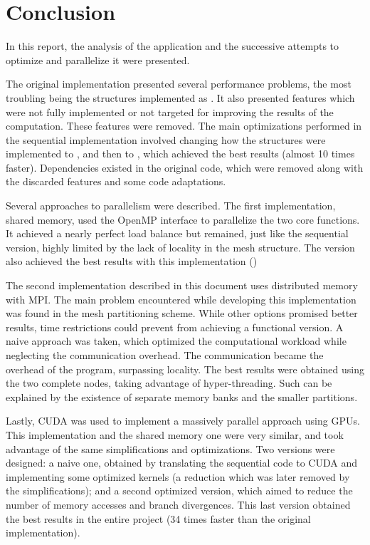 \section{Conclusion}
\label{sec:conclusion}

In this report, the analysis of the \polu application and the successive attempts to optimize and parallelize it were presented.

The original implementation presented several performance problems, the most troubling being the structures implemented as \aop. It also presented features which were not fully implemented or not targeted for improving the results of the computation. These features were removed. The main optimizations performed in the sequential implementation involved changing how the structures were implemented to \aos, and then to \soa, which achieved the best results (almost 10 times faster).
Dependencies existed in the original code, which were removed along with the discarded features and some code adaptations.

Several approaches to parallelism were described. The first implementation, shared memory, used the OpenMP interface to parallelize the two core functions. It achieved a nearly perfect load balance but remained, just like the sequential version, highly limited by the lack of locality in the mesh structure. The \soa version also achieved the best results with this implementation ()


The second implementation described in this document uses distributed memory with MPI. The main problem encountered while developing this implementation was found in the mesh partitioning scheme. While other options promised better results, time restrictions could prevent from achieving a functional version. A naive approach was taken, which optimized the computational workload while neglecting the communication overhead. The communication became the overhead of the program, surpassing locality. The best results were obtained using the two complete nodes, taking advantage of hyper-threading. Such can be explained by the existence of separate memory banks and the smaller partitions.

Lastly, CUDA was used to implement a massively parallel approach using GPUs. This implementation and the shared memory one were very similar, and took advantage of the same simplifications and optimizations. Two versions were designed: a naive one, obtained by translating the sequential code to CUDA and implementing some optimized kernels (a reduction which was later removed by the simplifications); and a second optimized version, which aimed to reduce the number of memory accesses and branch divergences. This last version obtained the best results in the entire project (34 times faster than the original implementation).

